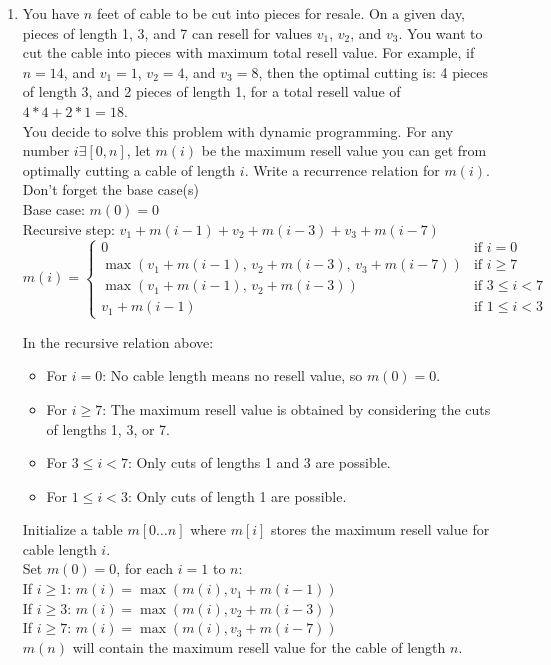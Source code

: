 \documentclass{article}
\begin{document}
\begin{enumerate}
\newpage
\item You have $n$ feet of cable to be cut into pieces for resale. On a given day, pieces of length 1, 3, and 7 can resell for values $v_1$, $v_2$, and $v_3$. You want to cut the cable into pieces with maximum total resell value. For example, if $n=14$, and $v_1=1$, $v_2=4$, and $v_3=8$, then the optimal cutting is: 4 pieces of length 3, and 2 pieces of length 1, for a total resell value of $4*4 + 2*1 = 18$. \\
You decide to solve this problem with dynamic programming. For any number $i \exists [0,n]$, let $m(i)$ be the maximum resell value you can get from optimally cutting a cable of length $i$. Write a recurrence relation for $m(i)$. Don't forget the base case(s) \\
\newline 
Base case: $m(0) = 0$ \\
Recursive step: $v_1 + m(i-1) + v_2 + m(i-3) + v_3 + m(i-7)$ \\
\[
m(i) = 
\begin{cases}
0 & \text{if } i = 0 \\
\max \left( v_1 + m(i-1), \, v_2 + m(i-3), \, v_3 + m(i-7) \right) & \text{if } i \geq 7 \\
\max \left( v_1 + m(i-1), \, v_2 + m(i-3) \right) & \text{if } 3 \leq i < 7 \\
v_1 + m(i-1) & \text{if } 1 \leq i < 3
\end{cases}
\]

In the recursive relation above:
\begin{itemize}
    \item For $i = 0$: No cable length means no resell value, so $m(0) = 0$.
    \item For $i \geq 7$: The maximum resell value is obtained by considering the cuts of lengths 1, 3, or 7.
    \item For $3 \leq i < 7$: Only cuts of lengths 1 and 3 are possible.
    \item For $1 \leq i < 3$: Only cuts of length 1 are possible.
\end{itemize}


Initialize a table $m[0 \ldots n]$ where $m[i]$ stores the maximum resell value for cable length $i$.  \\
\newline 
Set $m(0) = 0$, for each $i = 1$ to $n$: \\
If $i \geq 1$: $m(i) = \max(m(i), v_1 + m(i-1))$ \\
If $i \geq 3$: $m(i) = \max(m(i), v_2 + m(i-3))$ \\
If $i \geq 7$: $m(i) = \max(m(i), v_3 + m(i-7))$ \\
$m(n)$ will contain the maximum resell value for the cable of length $n$. \\



\end{enumerate}
\end{document}
